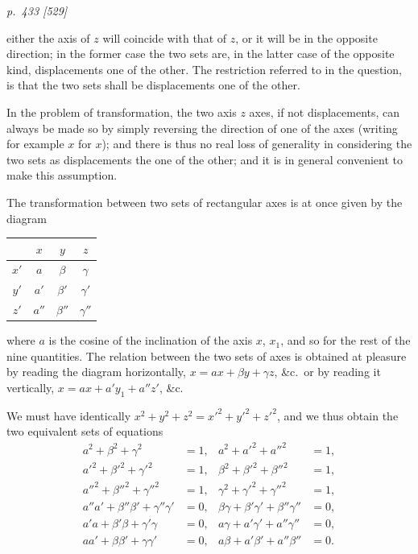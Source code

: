 \documentclass[11pt,a4paper]{article}
\theoremstyle{plain}
\theoremstyle{definition}
\begin{document}
\clearpage

\bigskip
\textit{p.~433 [529]}
\smallskip

\noindent
either the axis of $z$ will coincide with that of $z$, or it will be in the opposite
direction; in the former case the two sets are, in the latter case of the opposite kind,
displacements one of the other. The restriction referred to in the question, is that
the two sets shall be displacements one of the other.

In the problem of transformation, the two axis $z$ axes, if not displacements, can
always be made so by simply reversing the direction of one of the axes (writing for
example $x$ for $x$); and there is thus no real loss of generality in considering the
two sets as displacements the one of the other; and it is in general convenient to
make this assumption.

The transformation between two sets of rectangular axes is at once given by the
diagram

\begin{center}
\begin{tabular}{c|ccc}
   & $x$ & $y$ & $z$ \\\hline
$x'$ & $a$ & $\beta$ & $\gamma$ \\
$y'$ & $a'$ & $\beta'$ & $\gamma'$ \\
$z'$ & $a''$ & $\beta''$ & $\gamma''$ \\
\end{tabular}
\end{center}

\noindent
where $a$ is the cosine of the inclination of the axis $x$, $x_1$, and so for the rest of the
nine quantities. The relation between the two sets of axes is obtained at pleasure by
reading the diagram horizontally, $x = ax + \beta y + \gamma z$, \&c.\ or by reading it vertically,
$x = ax + a'y_1 + a''z'$, \&c.

We must have identically $x^2 + y^2 + z^2 = x'^2 + y'^2 + z'^2$, and we thus obtain the two
equivalent sets of equations
\begin{align*}
a^2 + \beta^2 + \gamma^2 &= 1,& a^2 + a'^2 + a''^2 &= 1,\\
a'^2 + \beta'^2 + \gamma'^2 &= 1,& \beta^2 + \beta'^2 + \beta''^2 &= 1,\\
a''^2 + \beta''^2 + \gamma''^2 &= 1,& \gamma^2 + \gamma'^2 + \gamma''^2 &= 1,\\
a''a' + \beta''\beta' + \gamma''\gamma' &= 0,& \beta\gamma + \beta'\gamma' + \beta''\gamma'' &= 0,\\
a'a + \beta'\beta + \gamma'\gamma &= 0,& a\gamma + a'\gamma' + a''\gamma'' &= 0,\\
a a' + \beta\beta' + \gamma\gamma' &= 0,& a\beta + a'\beta' + a''\beta'' &= 0.
\end{align*}
\end{document}
